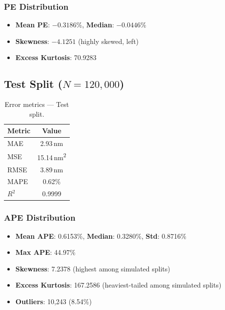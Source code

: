 \documentclass[11pt,a4paper]{article}
\begin{document}
\subsubsection{PE Distribution}

\begin{itemize}
  \item \textbf{Mean PE}: $-0.3186$\%, \textbf{Median}: $-0.0446$\%
  \item \textbf{Skewness}: $-4.1251$ (highly skewed, left)
  \item \textbf{Excess Kurtosis}: 70.9283
\end{itemize}

\subsection{Test Split ($N = 120,000$)}

\begin{table}[H]
\centering
\caption{Error metrics — Test split.}
\label{tab:metrics_test}
\begin{tabular}{lc}
\toprule
\textbf{Metric} & \textbf{Value} \\
\midrule
MAE                 & 2.93\,nm \\
MSE                 & 15.14\,nm\textsuperscript{2} \\
RMSE                & 3.89\,nm \\
MAPE                & 0.62\% \\
$R^2$               & 0.9999 \\
\bottomrule
\end{tabular}
\end{table}

\subsubsection{APE Distribution}

\begin{itemize}
  \item \textbf{Mean APE}: 0.6153\%, \textbf{Median}: 0.3280\%, \textbf{Std}: 0.8716\%
  \item \textbf{Max APE}: 44.97\%
  \item \textbf{Skewness}: 7.2378 (highest among simulated splits)
  \item \textbf{Excess Kurtosis}: 167.2586 (heaviest-tailed among simulated splits)
  \item \textbf{Outliers}: 10,243 (8.54\%)
\end{itemize}
\end{document}
